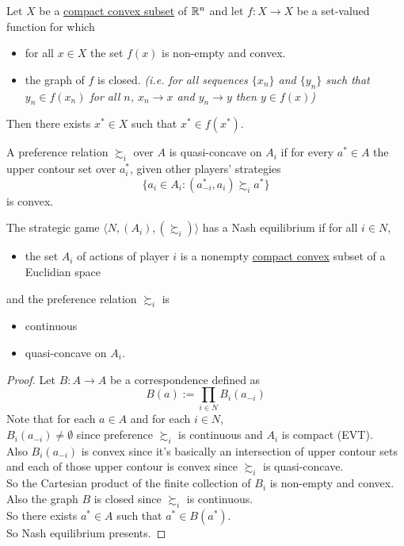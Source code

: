 \documentclass[11pt]{article}
\begin{document}
		\begin{lemma}
			Let $X$ be a \ul{compact convex subset} of $\mathbb{R}^n$ and let $f: X \to X$ be a set-valued function for which
			\begin{itemize}
				\item for all $x \in X$ the set $f(x)$ is non-empty and convex.
				\item the graph of $f$ is closed. \emph{(i.e. for all sequences $\{x_n\}$ and $\{y_n\}$ such that $y_n \in f(x_n)$ for all $n$, $x_n \to x$ and $y_n \to y$ then $y \in f(x)$)}
			\end{itemize}
			Then there exists $x^* \in X$ such that $x^* \in f(x^*)$.
		\end{lemma}
		
		\begin{definition}[pg.20]
			A preference relation $\succsim_i$ over $A$ is quasi-concave on $A_i$ if for every $a^* \in A$ the upper contour set over $a^*_i$, given other players' strategies
			\[
				\{a_i \in A_i: (a^*_{-i}, a_i) \succsim_i a^*\}
			\]
			is convex.
		\end{definition}
		
		\begin{proposition}[20.3]
			The strategic game $\langle N, (A_i), (\succsim_i) \rangle$ has a Nash equilibrium if for all $i \in N$,
			\begin{itemize}
				\item the set $A_i$ of actions of player $i$ is a nonempty \ul{compact convex} subset of a Euclidian space
			\end{itemize}
			and the preference relation $\succsim_i$ is
			\begin{itemize}
				\item continuous
				\item quasi-concave on $A_i$.
			\end{itemize}
		\end{proposition}
		
		\begin{proof}
			Let $B: A \to A$ be a correspondence defined as 
			\[
				B(a) := \prod_{i \in N} B_i(a_{-i})
			\]
			Note that for each $a \in A$ and for each $i \in N$, \\
			$B_i(a_{-i}) \neq \emptyset$ since preference $\succsim_i$ is continuous and $A_i$ is compact (EVT). \\
			Also $B_i(a_{-i})$ is convex since it's basically an intersection of  upper contour sets and each of those upper contour is convex since $\succsim_i$ is quasi-concave. \\
			So the Cartesian product of the finite collection of $B_i$ is non-empty and convex. \\
			Also the graph $B$ is closed since $\succsim_i$ is continuous. \\
			So there exists $a^* \in A$ such that $a^* \in B(a^*)$. \\
			So Nash equilibrium presents.
		\end{proof}
\end{document}
